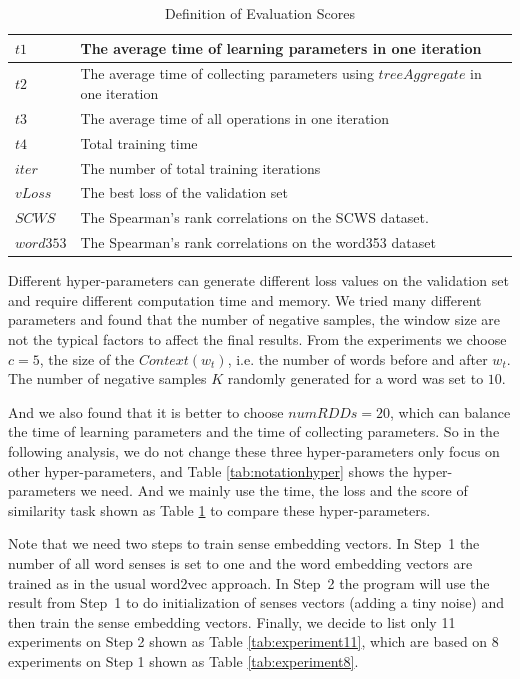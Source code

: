 \begin{table}[tb]
	\caption{Definition of Evaluation Scores } \label{tab:notationevalution}
	\begin{center}
		\begin{tabular}{|l|l|}
			\hline 
			$t1$ & The average time of learning parameters in one iteration  \\ \hline
			$t2$ & The average time of collecting parameters using $treeAggregate$ in one iteration \\ \hline
			
			$t3$ &The average time of all operations in one iteration \\ \hline
			
			$t4$ & Total training time \\ \hline
			$iter$ & The number of total training iterations \\ \hline
			$vLoss$ & The best loss of the validation set \\ \hline
			$SCWS$ & The Spearman’s rank correlations on the SCWS dataset. 
			\\ \hline
			$word353$ & The Spearman’s rank correlations on the word353 dataset \\ \hline
			
		\end{tabular}
	\end{center}
\end{table}

Different hyper-parameters can generate different loss values on the validation set and require different computation time and memory. We tried many different parameters and found that the number of negative samples, the window size are not the typical factors to affect the final results. From the experiments we choose $c=5$, the size of the $Context(w_t)$, i.e. the number of words before and after $w_t$.
The number of negative samples $K$ randomly generated for a word was set to $10$.

And we also found that it is better to choose $numRDDs = 20$, which can balance the time of learning parameters and the time of collecting parameters. So in the following analysis, we do not change these three hyper-parameters only focus on other hyper-parameters, and Table \ref{tab:notationhyper} shows the hyper-parameters we need. And we mainly use the time, the loss and the score of similarity task shown as Table \ref{tab:notationevalution} to compare these hyper-parameters. 

Note that we need two steps to train sense embedding vectors. In Step~1 the number of all word senses is set to one and the word embedding vectors are trained as in the usual word2vec approach. In Step~2 the program will use the result from Step~1 to do initialization of senses vectors (adding a tiny noise) and then train the sense embedding vectors. Finally, we decide to list only 11 experiments on Step 2 shown as Table \ref{tab:experiment11}, which are based on 8 experiments on Step 1 shown as Table \ref{tab:experiment8}. 




